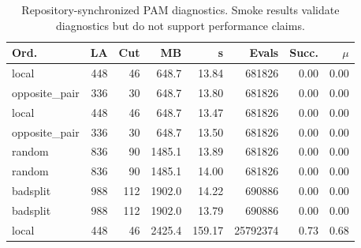 \begin{table}[t]
\centering
\caption{Repository-synchronized PAM diagnostics. Smoke results validate diagnostics but do not support performance claims.}
\label{tab:pam-diagnostics-summary}
\scriptsize
\setlength{\tabcolsep}{2.4pt}
\begin{tabular}{@{}lrrrrrrr@{}}
\toprule
Ord. & LA & Cut & MB & s & Evals & Succ. & $\mu$ \\
\midrule
local & 448 & 46 & 648.7 & 13.84 & 681826 & 0.00 & 0.00 \\
opposite\_pair & 336 & 30 & 648.7 & 13.80 & 681826 & 0.00 & 0.00 \\
local & 448 & 46 & 648.7 & 13.47 & 681826 & 0.00 & 0.00 \\
opposite\_pair & 336 & 30 & 648.7 & 13.50 & 681826 & 0.00 & 0.00 \\
random & 836 & 90 & 1485.1 & 13.89 & 681826 & 0.00 & 0.00 \\
random & 836 & 90 & 1485.1 & 14.00 & 681826 & 0.00 & 0.00 \\
badsplit & 988 & 112 & 1902.0 & 14.22 & 690886 & 0.00 & 0.00 \\
badsplit & 988 & 112 & 1902.0 & 13.79 & 690886 & 0.00 & 0.00 \\
local & 448 & 46 & 2425.4 & 159.17 & 25792374 & 0.73 & 0.68 \\
\bottomrule
\end{tabular}
\normalsize
\end{table}
